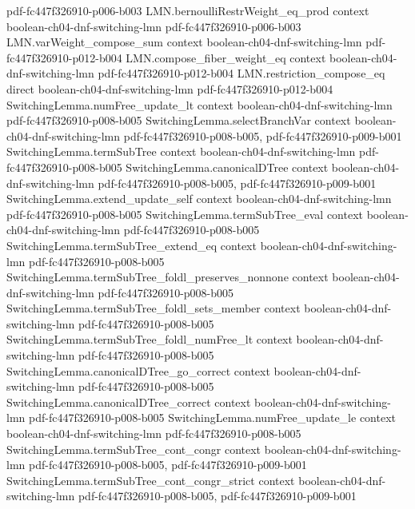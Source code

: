\begin{theorem}
  {pdf-fc447f326910-p006-b003}
\proofstep
  {LMN.bernoulliRestrWeight_eq_prod}
  {context}
  {boolean-ch04-dnf-switching-lmn}
  {pdf-fc447f326910-p006-b003}
\proofstep
  {LMN.varWeight_compose_sum}
  {context}
  {boolean-ch04-dnf-switching-lmn}
  {pdf-fc447f326910-p012-b004}
\proofstep
  {LMN.compose_fiber_weight_eq}
  {context}
  {boolean-ch04-dnf-switching-lmn}
  {pdf-fc447f326910-p012-b004}
\proofstep
  {LMN.restriction_compose_eq}
  {direct}
  {boolean-ch04-dnf-switching-lmn}
  {pdf-fc447f326910-p012-b004}
\proofstep
  {SwitchingLemma.numFree_update_lt}
  {context}
  {boolean-ch04-dnf-switching-lmn}
  {pdf-fc447f326910-p008-b005}
\proofstep
  {SwitchingLemma.selectBranchVar}
  {context}
  {boolean-ch04-dnf-switching-lmn}
  {pdf-fc447f326910-p008-b005,
    pdf-fc447f326910-p009-b001}
\proofstep
  {SwitchingLemma.termSubTree}
  {context}
  {boolean-ch04-dnf-switching-lmn}
  {pdf-fc447f326910-p008-b005}
\proofstep
  {SwitchingLemma.canonicalDTree}
  {context}
  {boolean-ch04-dnf-switching-lmn}
  {pdf-fc447f326910-p008-b005,
    pdf-fc447f326910-p009-b001}
\proofstep
  {SwitchingLemma.extend_update_self}
  {context}
  {boolean-ch04-dnf-switching-lmn}
  {pdf-fc447f326910-p008-b005}
\proofstep
  {SwitchingLemma.termSubTree_eval}
  {context}
  {boolean-ch04-dnf-switching-lmn}
  {pdf-fc447f326910-p008-b005}
\proofstep
  {SwitchingLemma.termSubTree_extend_eq}
  {context}
  {boolean-ch04-dnf-switching-lmn}
  {pdf-fc447f326910-p008-b005}
\proofstep
  {SwitchingLemma.termSubTree_foldl_preserves_nonnone}
  {context}
  {boolean-ch04-dnf-switching-lmn}
  {pdf-fc447f326910-p008-b005}
\proofstep
  {SwitchingLemma.termSubTree_foldl_sets_member}
  {context}
  {boolean-ch04-dnf-switching-lmn}
  {pdf-fc447f326910-p008-b005}
\proofstep
  {SwitchingLemma.termSubTree_foldl_numFree_lt}
  {context}
  {boolean-ch04-dnf-switching-lmn}
  {pdf-fc447f326910-p008-b005}
\proofstep
  {SwitchingLemma.canonicalDTree_go_correct}
  {context}
  {boolean-ch04-dnf-switching-lmn}
  {pdf-fc447f326910-p008-b005}
\proofstep
  {SwitchingLemma.canonicalDTree_correct}
  {context}
  {boolean-ch04-dnf-switching-lmn}
  {pdf-fc447f326910-p008-b005}
\proofstep
  {SwitchingLemma.numFree_update_le}
  {context}
  {boolean-ch04-dnf-switching-lmn}
  {pdf-fc447f326910-p008-b005}
\proofstep
  {SwitchingLemma.termSubTree_cont_congr}
  {context}
  {boolean-ch04-dnf-switching-lmn}
  {pdf-fc447f326910-p008-b005,
    pdf-fc447f326910-p009-b001}
\proofstep
  {SwitchingLemma.termSubTree_cont_congr_strict}
  {context}
  {boolean-ch04-dnf-switching-lmn}
  {pdf-fc447f326910-p008-b005,
    pdf-fc447f326910-p009-b001}
\proofstep

\end{theorem}
